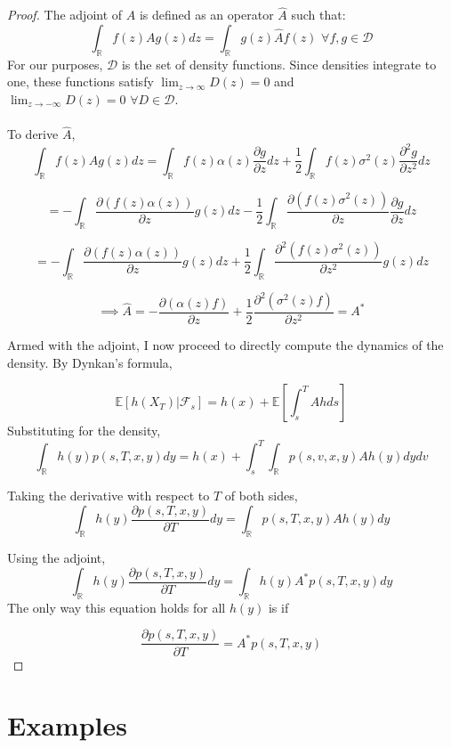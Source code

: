 \documentclass{article}
\theoremstyle{definition}
\begin{document}
\begin{proof}
	The adjoint of \(A\) is defined as an operator \(\hat{A}\) such that:
	\[\int_\mathbb{R} f(z) A g(z) dz = \int_\mathbb{R} g(z) \hat{A} f(z)\,\,\forall f, g \in \mathcal{D}\]
	For our purposes, \(\mathcal{D}\) is the set of density functions.  Since densities integrate to one, these functions satisfy \(\lim_{z \to \infty } D(z) =0 \) and \(\lim_{z \to -\infty} D(z)=0\,\,\forall D \in \mathcal{D}\).
	\\
	\\
	To derive \(\hat{A}\),  
	\[\int_\mathbb{R} f(z) A g(z) dz  = \int_\mathbb{R}  f(z)  \alpha(z) \frac{\partial g}{\partial z} dz+\frac{1}{2} \int_\mathbb{R} f(z)\sigma^2(z) \frac{\partial^2 g}{\partial z^2} dz \]
	
	\[= - \int_\mathbb{R}  \frac{\partial \left( f(z)  \alpha(z) \right)}{\partial z} g(z) dz -\frac{1}{2} \int_\mathbb{R} \frac{\partial \left(f(z)\sigma^2(z)\right) }{\partial z} \frac{\partial g}{\partial z} dz   \]
	
	\[ = - \int_\mathbb{R}  \frac{\partial \left( f(z)  \alpha(z) \right)}{\partial z} g(z) dz +\frac{1}{2} \int_\mathbb{R} \frac{\partial ^2 \left(f(z)\sigma^2(z) \right)}{\partial z^2} g(z) dz   \]
	
	
	\[ \implies \hat{A}= -\frac{\partial \left(\alpha(z) f\right)}{\partial z} + \frac{1}{2}\frac{\partial^2 \left(\sigma^2(z) f\right) } {\partial z^2} =A^* \]
	
	Armed with the adjoint, I now proceed to directly compute the dynamics of the density.  By Dynkan's formula,
	
	\[ \mathbb{E}[h(X_T)|\mathcal{F}_s]= h(x)+\mathbb{E}\left[\int_s^T A h ds \right]  \]
	Substituting for the density, 
	\[\int_\mathbb{R} h(y) p(s, T, x, y) dy = h(x)+ \int_s^T  \int_\mathbb{R}p(s, v, x, y) A h(y)   dy dv   \]
	
	Taking the derivative with respect to \(T\) of both sides,
	\[\int_\mathbb{R} h(y) \frac{\partial p(s, T, x, y)}{\partial T} dy = \int_\mathbb{R}  p(s, T, x, y) A h(y) dy   \]
	
	Using the adjoint,
	\[\int_\mathbb{R} h(y) \frac{\partial p(s, T, x, y)}{\partial T} dy= \int_\mathbb{R}  h(y) A^* p(s, T, x, y) dy  \]
	The only way this equation holds for all \(h(y)\) is if 
	
	\[\frac{\partial p(s, T, x, y)}{\partial T} = A^* p(s, T, x, y)  \]
	
	
\end{proof}

\section{Examples}
\end{document}
